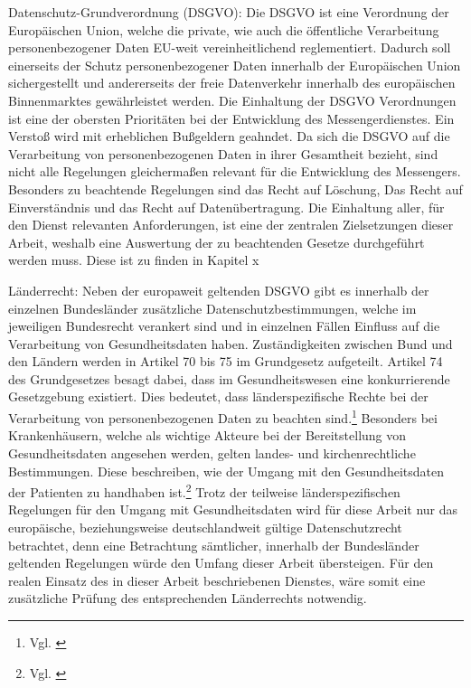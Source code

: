 Datenschutz-Grundverordnung (DSGVO): Die DSGVO ist eine Verordnung der Europäischen Union, welche die private, wie auch die öffentliche Verarbeitung personenbezogener Daten EU-weit vereinheitlichend reglementiert. Dadurch soll einerseits der Schutz personenbezogener Daten innerhalb der Europäischen Union sichergestellt und andererseits der freie Datenverkehr innerhalb des europäischen Binnenmarktes gewährleistet werden. Die Einhaltung der DSGVO Verordnungen ist eine der obersten Prioritäten bei der Entwicklung des Messengerdienstes. Ein Verstoß wird mit erheblichen Bußgeldern geahndet. Da sich die DSGVO auf die Verarbeitung von personenbezogenen Daten in ihrer Gesamtheit bezieht, sind nicht alle Regelungen gleichermaßen relevant für die Entwicklung des Messengers. Besonders zu beachtende Regelungen sind \glqq das Recht auf Löschung\grqq{}, \glqq Das Recht auf Einverständnis\grqq{} und \glqq das Recht auf Datenübertragung\grqq. Die Einhaltung aller, für den Dienst relevanten Anforderungen, ist eine der zentralen Zielsetzungen dieser Arbeit, weshalb eine Auswertung der zu beachtenden Gesetze durchgeführt werden muss. Diese ist zu finden in Kapitel x

Länderrecht: Neben der europaweit geltenden DSGVO gibt es innerhalb der einzelnen Bundesländer zusätzliche Datenschutzbestimmungen, welche im jeweiligen Bundesrecht verankert sind und in einzelnen Fällen Einfluss auf die Verarbeitung von Gesundheitsdaten haben.
Zuständigkeiten zwischen Bund und den Ländern werden in Artikel 70 bis 75 im Grundgesetz aufgeteilt. Artikel 74 des Grundgesetzes besagt dabei, dass im Gesundheitswesen eine konkurrierende Gesetzgebung existiert. Dies bedeutet, dass länderspezifische Rechte bei der Verarbeitung von personenbezogenen Daten zu beachten sind.\footnote{Vgl. \cite[S. 8]{Schubert2014}} Besonders bei Krankenhäusern, welche als wichtige Akteure bei der Bereitstellung von Gesundheitsdaten angesehen werden, gelten landes- und kirchenrechtliche Bestimmungen. Diese beschreiben, wie der Umgang mit den Gesundheitsdaten der Patienten zu handhaben ist.\footnote{Vgl. \cite[S. 21]{Bundesaerztekammer2019}}
Trotz der teilweise länderspezifischen Regelungen für den Umgang mit Gesundheitsdaten wird für diese Arbeit nur das europäische, beziehungsweise deutschlandweit gültige Datenschutzrecht betrachtet, denn eine Betrachtung sämtlicher, innerhalb der Bundesländer geltenden Regelungen würde den Umfang dieser Arbeit übersteigen. Für den realen Einsatz des in dieser Arbeit beschriebenen Dienstes, wäre somit eine zusätzliche Prüfung des entsprechenden Länderrechts notwendig.

